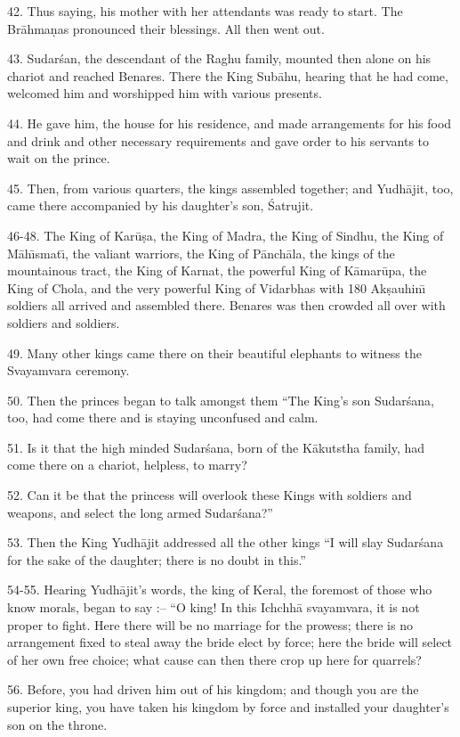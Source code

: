 42. Thus saying, his mother with her attendants was ready to start. The Br\=ahma\d{n}as pronounced their blessings. All then went out.

43. Sudar\'san, the descendant of the Raghu family, mounted then alone on his chariot and reached Benares. There the King Sub\=ahu, hearing that he had come, welcomed him and worshipped him with various presents.

44. He gave him, the house for his residence, and made arrangements for his food and drink and other necessary requirements and gave order to his servants to wait on the prince.

45. Then, from various quarters, the kings assembled together; and Yudh\=ajit, too, came there accompanied by his daughter's son, \'Satrujit.

46-48. The King of Kar\=u\d{s}a, the King of Madra, the King of Sindhu, the King of M\=ah\={\i}smat\={\i}, the valiant warriors, the King of P\=anch\=ala, the kings of the mountainous tract, the King of Karnat, the powerful King of K\=amar\=upa, the King of Chola, and the very powerful King of Vidarbhas with 180 Ak\d{s}auhin\={\i} soldiers all arrived and assembled there. Benares was then crowded all over with soldiers and soldiers.

49. Many other kings came there on their beautiful elephants to witness the Svayamvara ceremony.

50. Then the princes began to talk amongst them ``The King's son Sudar\'sana, too, had come there and is staying unconfused and calm.

51. Is it that the high minded Sudar\'sana, born of the K\=akutstha family, had come there on a chariot, helpless, to marry?

52. Can it be that the princess will overlook these Kings with soldiers and weapons, and select the long armed Sudar\'sana?''

53. Then the King Yudh\=ajit addressed all the other kings ``I will slay Sudar\'sana for the sake of the daughter; there is no doubt in this.''

54-55. Hearing Yudh\=ajit's words, the king of Keral, the foremost of those who know morals, began to say :-- ``O king! In this Ichchh\=a svayamvara, it is not proper to fight. Here there will be no marriage for the prowess; there is no arrangement fixed to steal away the bride elect by force; here the bride will select of her own free choice; what cause can then there crop up here for quarrels?

56. Before, you had driven him out of his kingdom; and though you are the superior king, you have taken his kingdom by force and installed your daughter's son on the throne.

